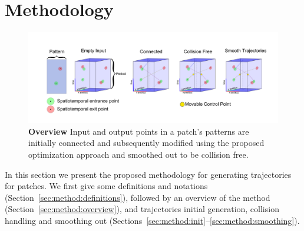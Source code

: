 \section{Methodology}
\label{sec:method}

\begin{figure}[t]
	\begin{center}
	\includegraphics[width=0.9\linewidth]{./images/overview-hd-old.png}
	\caption{
		\textbf{Overview} Input and output points in a patch's patterns are initially connected and subsequently modified using the proposed optimization approach and smoothed out to be collision free.
	}
	\label{fig:overview}
	\end{center}
\end{figure}


In this section we present the proposed methodology for generating trajectories for patches.
We first give some definitions and notations (Section~\ref{sec:method:definitions}), followed by an overview of the method (Section~\ref{sec:method:overview}), and trajectories initial generation, collision handling and smoothing out (Sections~\ref{sec:method:init}--\ref{sec:method:smoothing}).

